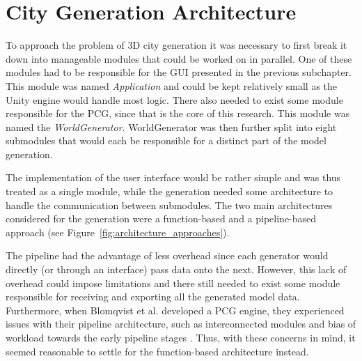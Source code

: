 \section{City Generation Architecture}
\label{sec:city-gen-arch}

To approach the problem of 3D city generation it was necessary to first break it down into manageable modules that could be worked on in parallel.
One of these modules had to be responsible for the GUI presented in the previous subchapter.
This module was named \textit{Application} and could be kept relatively small as the Unity engine would handle most logic.
There also needed to exist some module responsible for the PCG, since that is the core of this research.
This module was named the \textit{WorldGenerator}.
WorldGenerator was then further split into eight submodules that would each be responsible for a distinct part of the model generation.

The implementation of the user interface would be rather simple and was thus treated as a single module, while the generation needed some architecture to handle the communication between submodules.
The two main architectures considered for the generation were a function-based and a pipeline-based approach (see Figure~\ref{fig:architecture_approaches}).

The pipeline had the advantage of less overhead since each generator would directly (or through an interface) pass data onto the next.
However, this lack of overhead could impose limitations and there still needed to exist some module responsible for receiving and exporting all the generated model data.
Furthermore, when Blomqvist et al. developed a PCG engine, they experienced issues with their pipeline architecture, such as interconnected modules and bias of workload towards the early pipeline stages \cite[p. 45]{ba_landscape}.
Thus, with these concerns in mind, it seemed reasonable to settle for the function-based architecture instead.

